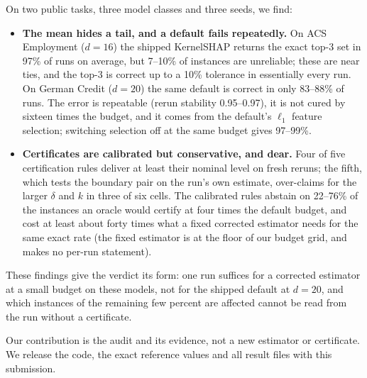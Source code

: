 On two public tasks, three model classes and three seeds, we find:
\begin{itemize}
\item \textbf{The mean hides a tail, and a default fails repeatedly.} On ACS Employment ($d=16$) the shipped KernelSHAP returns the exact top-3 set in 97\% of runs on average, but 7--10\% of instances are unreliable; these are near ties, and the top-3 is correct up to a 10\% tolerance in essentially every run. On German Credit ($d=20$) the same default is correct in only 83--88\% of runs. The error is repeatable (rerun stability 0.95--0.97), it is not cured by sixteen times the budget, and it comes from the default's $\ell_1$ feature selection; switching selection off at the same budget gives 97--99\%.
\item \textbf{Certificates are calibrated but conservative, and dear.} Four of five certification rules deliver at least their nominal level on fresh reruns; the fifth, which tests the boundary pair on the run's own estimate, over-claims for the larger $\delta$ and $k$ in three of six cells. The calibrated rules abstain on 22--76\% of the instances an oracle would certify at four times the default budget, and cost at least about forty times what a fixed corrected estimator needs for the same exact rate (the fixed estimator is at the floor of our budget grid, and makes no per-run statement).
\end{itemize}
These findings give the verdict its form: one run suffices for a corrected estimator at a small budget on these models, not for the shipped default at $d=20$, and which instances of the remaining few percent are affected cannot be read from the run without a certificate.

Our contribution is the audit and its evidence, not a new estimator or certificate. We release the code, the exact reference values and all result files with this submission.
